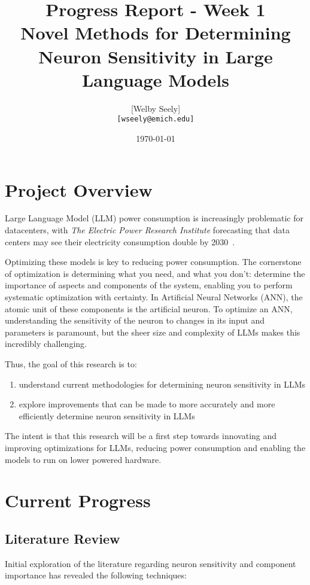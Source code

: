 \documentclass{article}
\title{Progress Report - Week 1 \\
\large Novel Methods for Determining Neuron Sensitivity in Large Language Models}
\author{
    [Welby Seely] \\
    \texttt{[wseely@emich.edu]}
}
\date{\today}
\begin{document}
    \maketitle



    \section*{Project Overview}
    Large Language Model (LLM) power consumption is increasingly problematic for datacenters, with \textit{The Electric Power
    Research Institute} forecasting that data centers may see their electricity consumption double by
    2030~\cite{kindig2024}.

    Optimizing these models is key to reducing power consumption.
    The cornerstone of optimization is determining what you need, and what you don't: determine the importance of
    aspects and components of the system, enabling you to perform systematic optimization with certainty.
    In Artificial Neural Networks (ANN), the atomic unit of these components is the artificial neuron.
    To optimize an ANN, understanding the sensitivity of the neuron to changes in its input and parameters is paramount,
    but the sheer size and complexity of LLMs makes this incredibly challenging.

    Thus, the goal of this research is to:
    \begin{enumerate}
        \item understand current methodologies for determining neuron sensitivity in LLMs
        \item explore improvements that can be made to more accurately and more efficiently determine neuron sensitivity in
        LLMs
    \end{enumerate}

    The intent is that this research will be a first step towards innovating and improving optimizations for LLMs,
    reducing power consumption and enabling the models to run on lower powered hardware.

    \section*{Current Progress}
    \subsection*{Literature Review}
    Initial exploration of the literature regarding neuron sensitivity and component importance has revealed the
    following techniques:
\end{document}
